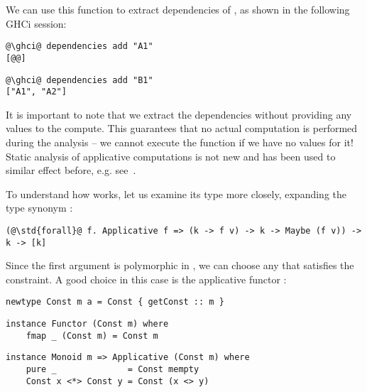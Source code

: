 \noindent
We can use this function to extract dependencies of , as shown in the
following GHCi session:

\vspace{1mm}
\begin{verbatim}
@\ghci@ dependencies add "A1"
[@@]
\end{verbatim}
\begin{verbatim}
@\ghci@ dependencies add "B1"
["A1", "A2"]
\end{verbatim}
\vspace{1mm}

\noindent
It is important to note that we extract the dependencies without providing any
values to the compute. This guarantees that no actual computation is performed
during the analysis -- we cannot execute the function \hs{(+)} if we have no
values for it! Static analysis of applicative computations is not new and has
been used to similar effect before, e.g. see~\cite{free-applicatives}.

To understand how  works, let us examine its type more closely,
expanding the type synonym :

\vspace{1mm}
\begin{verbatim}
(@\std{forall}@ f. Applicative f => (k -> f v) -> k -> Maybe (f v)) -> k -> [k]
\end{verbatim}
\vspace{1mm}

\noindent
Since the first argument is polymorphic in , we can choose any  that
satisfies the  constraint. A good choice in this case is the
applicative functor :

\vspace{1mm}
\begin{verbatim}
newtype Const m a = Const { getConst :: m }
\end{verbatim}
\vspace{0.5mm}
\begin{verbatim}
instance Functor (Const m) where
    fmap _ (Const m) = Const m
\end{verbatim}
\vspace{0.5mm}
\begin{verbatim}
instance Monoid m => Applicative (Const m) where
    pure _              = Const mempty
    Const x <*> Const y = Const (x <> y)
\end{verbatim}
\vspace{1mm}

